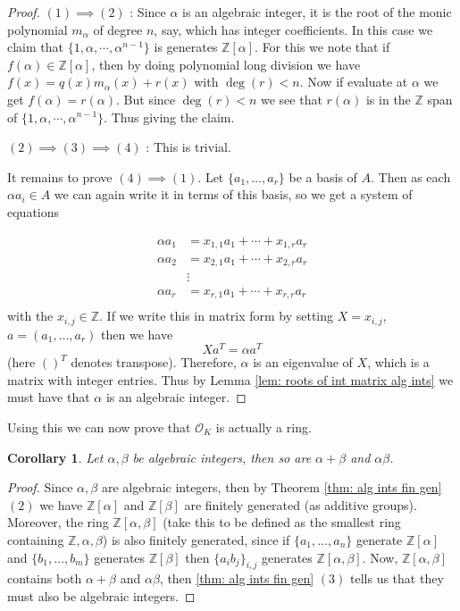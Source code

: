 \documentclass[11pt,a4paper]{report}
\theoremstyle{plain}
\newtheorem{corollary}[subsection]{Corollary}
\theoremstyle{definition}
\theoremstyle{definition}
\newcommand{\ZZ}{\mathbb{Z}}
\def \a{\alpha}
\def \OO {\mathcal{O}}
\begin{document}
	\begin{proof}
		$(1) \implies (2)$ : Since $\a$ is an algebraic integer, it is the root of the monic polynomial $m_\a$ of degree $n$, say, which has integer coefficients. In this case we claim that $\{1,\a,\cdots,\a^{n-1}\}$ is generates $\ZZ[\a]$. For this we note that if $f(\a) \in \ZZ[\a]$, then by doing polynomial long division we have $f(x)=q(x)m_\a(x)+r(x)$ with $\deg(r)<n$. Now if evaluate at $\a$ we get $f(\a)=r(\a)$. But since $\deg(r)<n$ we see that $r(\a)$ is in the $\ZZ$ span of  $\{1,\a,\cdots,\a^{n-1}\}$. Thus giving the claim.
		
		$(2)\implies (3) \implies (4)$ : This is trivial.
		
		It remains to prove $(4) \implies (1)$. Let $\{a_1,\dots,a_r\}$ be a basis of $A$. Then as each $\a a_i \in A$ we can again write it in terms of this basis, so we get a system of equations 
		
		\begin{align*}
			\a a_1 &=x_{1,1} a_1+\cdots+x_{1,r}a_r  \\
			\a a_2 &=x_{2,1} a_1+\cdots+x_{2,r}a_r  \\
			&\vdots \\
			\a a_r &=x_{r,1} a_1+\cdots+x_{r,r}a_r  \\
		\end{align*}
		with the $x_{i,j} \in \ZZ$. If we write this in matrix form by setting $X={x_{i,j}}$, $a=(a_1,\dots,a_r)$ then we have \[X a^{T}=\a a^{T}\] (here $()^T$ denotes transpose). Therefore, $\a$ is an eigenvalue of $X$, which is a matrix with integer entries. Thus by Lemma \ref{lem: roots of int matrix alg ints} we must have that $\a$ is an algebraic integer.
		
	\end{proof}
	
	
	
	Using this we can now prove that $\OO_K$ is actually a ring.
	
	\begin{corollary}\label{cor: sum and mult of alg ints is alg ints}
		Let $\a,\beta$ be algebraic integers, then so are $\a+\beta$ and $\a \beta$.
	\end{corollary}
	
	\begin{proof}
		Since $\a,\beta$ are algebraic integers, then by Theorem \ref{thm: alg ints fin gen} $(2)$ we have $\ZZ[\a]$ and $\ZZ[\beta]$ are finitely generated (as additive groups). Moreover, the ring $\ZZ[\a,\beta]$ (take this to be defined as the smallest ring containing $\ZZ,\a,\beta$) is also finitely generated, since if $\{a_1,\dots,a_n\}$ generate $\ZZ[\a]$ and $\{b_1,\dots,b_m\}$ generates $\ZZ[\beta]$ then $\{a_ib_j\}_{i,j}$ generates $\ZZ[\a,\beta]$. Now, $\ZZ[\a,\beta]$ contains both $\a+\beta$ and $\a\beta$, then \ref{thm: alg ints fin gen} $(3)$ tells us that they must also be algebraic integers.
	\end{proof}
	
\end{document}
